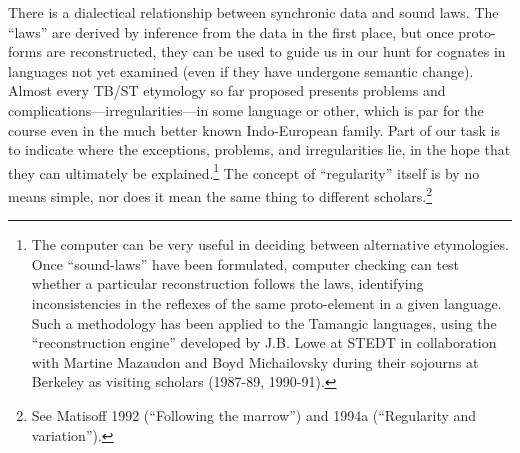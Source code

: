 There is a dialectical relationship between synchronic data and sound laws.
The “laws” are derived by inference from the data in the first place, but once
proto-forms are reconstructed, they can be used to guide us in our hunt for
cognates in languages not yet examined (even if they have undergone semantic
change). Almost every TB/ST etymology so far proposed presents problems and
complications—irregularities—in some language or other, which is par for
the course even in the much better known Indo-European family. Part of our task
is to indicate where the exceptions, problems, and irregularities lie, in the
hope that they can ultimately be explained.\footnote{The computer can be very
useful in deciding between alternative etymologies. Once “sound-laws” have been
formulated, computer checking can test whether a particular reconstruction
follows the laws, identifying inconsistencies in the reflexes of the same
proto-element in a given language. Such a methodology has been applied to the
Tamangic languages, using the “reconstruction engine” developed by J.B. Lowe at
STEDT in collaboration with Martine Mazaudon and Boyd Michailovsky during their
sojourns at Berkeley as visiting scholars (1987-89, 1990-91).} The concept of
“regularity” itself is by no means simple, nor does it mean the same thing to
different scholars.\footnote{See Matisoff 1992 (“Following the marrow”) and
1994a (“Regularity and variation”).}


